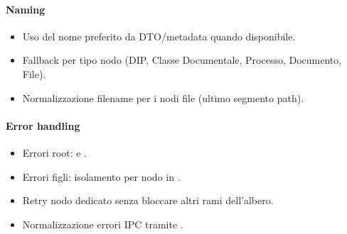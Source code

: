 \paragraph{Naming}
\begin{itemize}
	\item Uso del nome preferito da DTO/metadata quando disponibile.
	\item Fallback per tipo nodo (DIP, Classe Documentale, Processo, Documento, File).
	\item Normalizzazione filename per i nodi file (ultimo segmento path).
\end{itemize}

\paragraph{Error handling}
\begin{itemize}
	\item Errori root:  e .
	\item Errori figli: isolamento per nodo in .
	\item Retry nodo dedicato senza bloccare altri rami dell'albero.
	\item Normalizzazione errori IPC tramite .
\end{itemize}

